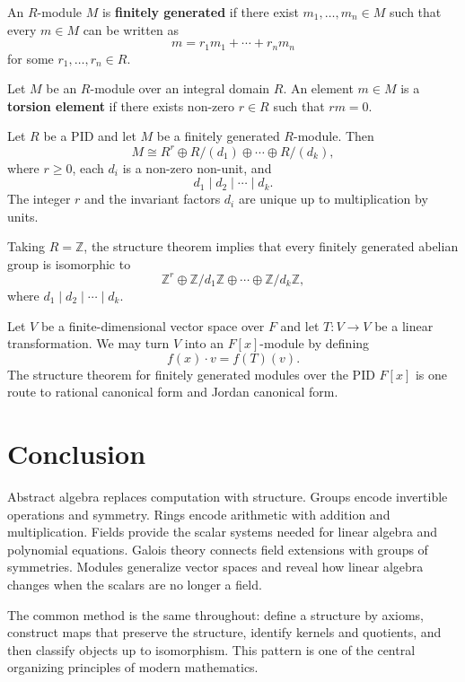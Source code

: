 \begin{definition}
An $R$-module $M$ is \textbf{finitely generated} if there exist $m_1,\dots,m_n\in M$ such that every $m\in M$ can be written as
\[
    m=r_1m_1+\cdots+r_nm_n
\]
for some $r_1,\dots,r_n\in R$.
\end{definition}

\begin{definition}
Let $M$ be an $R$-module over an integral domain $R$. An element $m\in M$ is a \textbf{torsion element} if there exists non-zero $r\in R$ such that $rm=0$.
\end{definition}

\begin{theorem}
Let $R$ be a PID and let $M$ be a finitely generated $R$-module. Then
\[
    M\cong R^r\oplus R/(d_1)\oplus\cdots\oplus R/(d_k),
\]
where $r\geq 0$, each $d_i$ is a non-zero non-unit, and
\[
    d_1\mid d_2\mid\cdots\mid d_k.
\]
The integer $r$ and the invariant factors $d_i$ are unique up to multiplication by units.
\end{theorem}

\begin{example}
Taking $R=\mathbb{Z}$, the structure theorem implies that every finitely generated abelian group is isomorphic to
\[
    \mathbb{Z}^r\oplus \mathbb{Z}/d_1\mathbb{Z}\oplus\cdots\oplus\mathbb{Z}/d_k\mathbb{Z},
\]
where $d_1\mid d_2\mid\cdots\mid d_k$.
\end{example}

\begin{example}
Let $V$ be a finite-dimensional vector space over $F$ and let $T:V\to V$ be a linear transformation. We may turn $V$ into an $F[x]$-module by defining
\[
    f(x)\cdot v=f(T)(v).
\]
The structure theorem for finitely generated modules over the PID $F[x]$ is one route to rational canonical form and Jordan canonical form.
\end{example}

\section{Conclusion}

Abstract algebra replaces computation with structure. Groups encode invertible operations and symmetry. Rings encode arithmetic with addition and multiplication. Fields provide the scalar systems needed for linear algebra and polynomial equations. Galois theory connects field extensions with groups of symmetries. Modules generalize vector spaces and reveal how linear algebra changes when the scalars are no longer a field.

The common method is the same throughout: define a structure by axioms, construct maps that preserve the structure, identify kernels and quotients, and then classify objects up to isomorphism. This pattern is one of the central organizing principles of modern mathematics.
